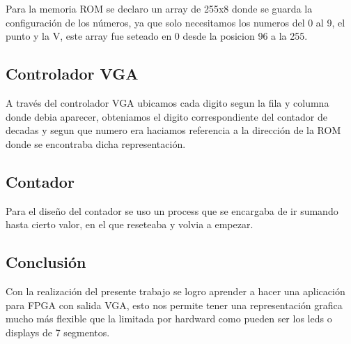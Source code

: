 \documentclass{article}
\begin{document}
Para la memoria ROM se declaro un array de 255x8 donde se guarda la configuración de los números, ya que solo necesitamos los numeros del 0 al 9, el punto y la V, este array fue seteado en 0 desde la posicion 96 a la 255.

\subsection{Controlador VGA}

A través del controlador VGA ubicamos cada digito segun la fila y columna donde debia aparecer, obteniamos el digito correspondiente del contador de decadas y segun que numero era haciamos referencia a la dirección de la ROM donde se encontraba dicha representación.

\subsection{Contador}

Para el diseño del contador se uso un process que se encargaba de ir sumando hasta cierto valor, en el que reseteaba y volvia a empezar.

\subsection{Conclusión}

Con la realización del presente trabajo se logro aprender a hacer una aplicación para FPGA con salida VGA, esto nos permite tener una representación grafica mucho más flexible que la limitada por hardward como pueden ser los leds o displays de 7 segmentos.
\end{document}
